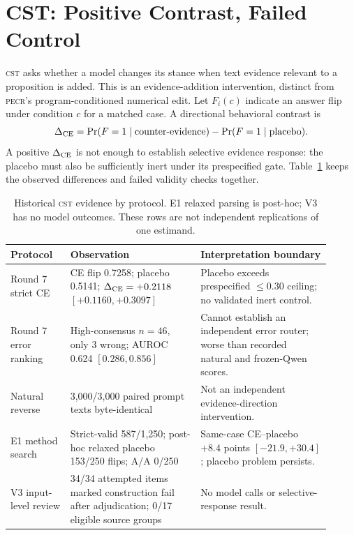 \documentclass[11pt]{article}
\newcommand{\PECR}{\textsc{pecr}}
\newcommand{\CST}{\textsc{cst}}
\begin{document}
\section{CST: Positive Contrast, Failed Control}
\CST{} asks whether a model changes its stance when text evidence relevant to a proposition is added. This is an evidence-addition intervention, distinct from \PECR{}'s program-conditioned numerical edit. Let $F_i(c)$ indicate an answer flip under condition $c$ for a matched case. A directional behavioral contrast is
\begin{equation}
\Delta_{\rm CE}=\Pr(F=1\mid \text{counter-evidence})-\Pr(F=1\mid\text{placebo}).
\label{eq:cst}
\end{equation}
A positive $\Delta_{\rm CE}$ is not enough to establish selective evidence response: the placebo must also be sufficiently inert under its prespecified gate. Table~\ref{tab:cst} keeps the observed differences and failed validity checks together.

\begin{table}[t]
\centering
\small
\caption{Historical \CST{} evidence by protocol. E1 relaxed parsing is post-hoc; V3 has no model outcomes. These rows are not independent replications of one estimand.}
\label{tab:cst}
\begin{tabular}{p{0.17\linewidth}p{0.37\linewidth}p{0.37\linewidth}}
\toprule
Protocol & Observation & Interpretation boundary \\
\midrule
Round 7 strict CE & CE flip 0.7258; placebo 0.5141; $\Delta_{\rm CE}=+0.2118$ $[+0.1160,+0.3097]$ & Placebo exceeds prespecified $\leq0.30$ ceiling; no validated inert control. \\
Round 7 error ranking & High-consensus $n=46$, only 3 wrong; AUROC 0.624 $[0.286,0.856]$ & Cannot establish an independent error router; worse than recorded natural and frozen-Qwen scores. \\
Natural reverse & 3,000/3,000 paired prompt texts byte-identical & Not an independent evidence-direction intervention. \\
E1 method search & Strict-valid 587/1,250; post-hoc relaxed placebo 153/250 flips; A/A 0/250 & Same-case CE--placebo $+8.4$ points $[-21.9,+30.4]$; placebo problem persists. \\
V3 input-level review & 34/34 attempted items marked construction fail after adjudication; 0/17 eligible source groups & No model calls or selective-response result. \\
\bottomrule
\end{tabular}
\end{table}
\end{document}
